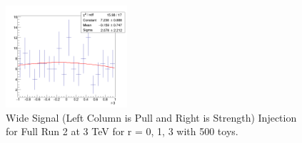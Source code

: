 \begin{figure}[!htb]
	\includegraphics[width=0.4\textwidth]{Figures/signalInjection3_500_sigstrength_3000wide.png}
	\caption{Wide Signal (Left Column is Pull and Right is Strength) Injection for Full Run 2 at 3 TeV for r = 0, 1, 3 with 500 toys.}
	\label{fig:signalInjection3000plotwide}
\end{figure}